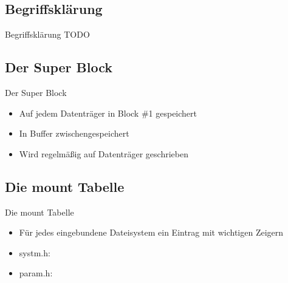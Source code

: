 \documentclass{beamer}
\begin{document}
\subsection{Begriffsklärung}

\begin{frame}{Begriffsklärung}
    TODO
\end{frame}




\subsection{Der Super Block}

\begin{frame}{Der Super Block}
    \begin{itemize}
        \item Auf jedem Datenträger in Block \#1 gespeichert
        \item In Buffer zwischengespeichert
        \item Wird regelmäßig auf Datenträger geschrieben
    \end{itemize}

    \vfill

    
\end{frame}




\subsection{Die mount Tabelle}

\begin{frame}{Die mount Tabelle}
    \begin{itemize}
        \item Für jedes eingebundene Dateisystem ein Eintrag mit wichtigen Zeigern

        \vfill

        \item systm.h:
            \vspace{5pt}
            

        \vfill

        \item param.h:
            \vspace{5pt}
            

        \vfill
    \end{itemize}
\end{frame}
\end{document}
